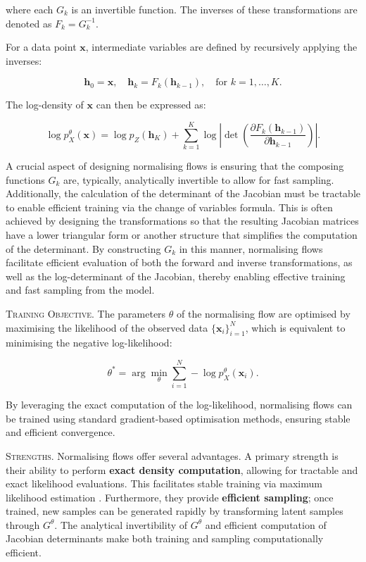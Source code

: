 \noindent where each $G_k$ is an invertible function. The inverses of these transformations are denoted as $F_k = G_k^{-1}$.

\noindent For a data point $\mathbf{x}$, intermediate variables are defined by recursively applying the inverses:

\[
\mathbf{h}_0 = \mathbf{x}, \quad \mathbf{h}_k = F_k(\mathbf{h}_{k-1}), \quad \text{for } k = 1, \dots, K.
\]

\noindent The log-density of $\mathbf{x}$ can then be expressed as:

\[
\log p^\theta_X(\mathbf{x}) = \log p_Z(\mathbf{h}_K) + \sum_{k=1}^{K} \log \left| \det \left( \frac{\partial F_k(\mathbf{h}_{k-1})}{\partial \mathbf{h}_{k-1}} \right) \right|.
\]

A crucial aspect of designing normalising flows is ensuring that the composing functions \( G_k \) are, typically, analytically invertible to allow for fast sampling. Additionally, the calculation of the determinant of the Jacobian must be tractable to enable efficient training via the change of variables formula. This is often achieved by designing the transformations so that the resulting Jacobian matrices have a lower triangular form or another structure that simplifies the computation of the determinant. By constructing \( G_k \) in this manner, normalising flows facilitate efficient evaluation of both the forward and inverse transformations, as well as the log-determinant of the Jacobian, thereby enabling effective training and fast sampling from the model.

\textsc{Training Objective.} The parameters $\theta$ of the normalising flow are optimised by maximising the likelihood of the observed data $\{\mathbf{x}_i\}_{i=1}^N$, which is equivalent to minimising the negative log-likelihood:

\[
\theta^* = \arg \min_{\theta} \sum_{i=1}^N -\log p^\theta_X(\mathbf{x}_i).
\]

By leveraging the exact computation of the log-likelihood, normalising flows can be trained using standard gradient-based optimisation methods, ensuring stable and efficient convergence.

\textsc{Strengths.} Normalising flows offer several advantages. A primary strength is their ability to perform \textbf{exact density computation}, allowing for tractable and exact likelihood evaluations. This facilitates stable training via maximum likelihood estimation \cite{papamakarios2019normalizing}. Furthermore, they provide \textbf{efficient sampling}; once trained, new samples can be generated rapidly by transforming latent samples through \( G^\theta \). The analytical invertibility of \( G^\theta \) and efficient computation of Jacobian determinants make both training and sampling computationally efficient.

